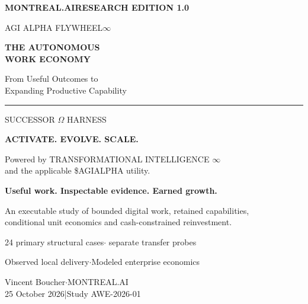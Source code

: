 \hypersetup{pageanchor=false}
\begin{titlepage}
\color{white}\sffamily
\vspace*{0.6cm}
{\small\bfseries MONTREAL.AI\hfill RESEARCH EDITION 1.0}\par
\vspace{1.4cm}
{\large\color{white!75}AGI ALPHA FLYWHEEL\quad $\infty$}\par
\vspace{0.4cm}
{\fontsize{37}{41}\selectfont\bfseries THE AUTONOMOUS\\WORK ECONOMY}\par
\vspace{0.7cm}
{\Large From Useful Outcomes to\\Expanding Productive Capability}\par
\vspace{0.8cm}
\rule{2.0cm}{1.0pt}\par
\vspace{0.3cm}
{\large SUCCESSOR $\Omega$ HARNESS}\par
{\small\bfseries ACTIVATE. EVOLVE. SCALE.}\par
\vspace{0.3cm}
{\small Powered by TRANSFORMATIONAL INTELLIGENCE $\infty$\\and the applicable \$AGIALPHA utility.}\par
\vfill
\begin{minipage}{0.94\linewidth}
{\large\bfseries Useful work. Inspectable evidence. Earned growth.}\par
\vspace{0.35cm}
{\normalsize An executable study of bounded digital work, retained capabilities,\\conditional unit economics and cash-constrained reinvestment.}\par
\vspace{0.5cm}
{\small 24 primary structural cases\quad $\cdot$ separate transfer probes}\par
{\small Observed local delivery\quad $\cdot$\quad Modeled enterprise economics}\par
\vspace{0.7cm}
{\small Vincent Boucher\quad $\cdot$\quad MONTREAL.AI\\25 October 2026\quad |\quad Study AWE-2026-01}
\end{minipage}
\vspace*{0.3cm}
\end{titlepage}
